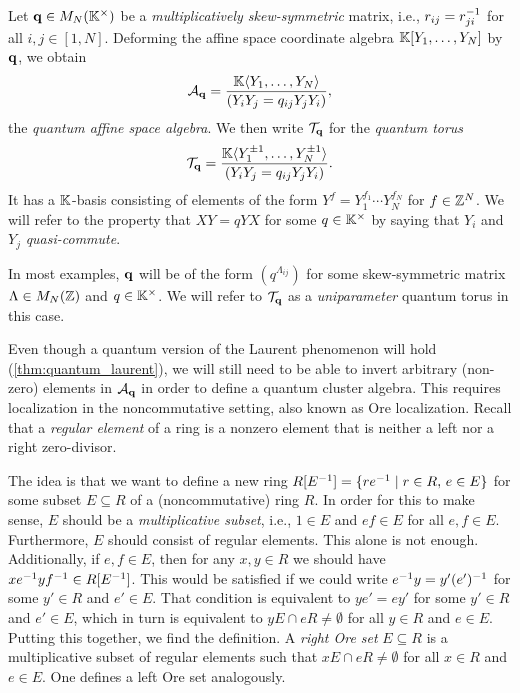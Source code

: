 Let $\mathbf{q} \in M_N(\mathbb{K}^\times)$ be a \emph{multiplicatively
	skew-symmetric} matrix, i.e., $r_{ij} =
	r_{ji}^{-1}$ for all $i,j \in [1, N]$. Deforming the affine space coordinate algebra
$\mathbb{K}[Y_1, \dots, Y_N]$ by $\mathbf{q}$, we obtain
\begin{equation*}
	\mathcal{A}_{\mathbf{q}} = \frac{\mathbb{K} \langle Y_1 , \dots, Y_N\rangle}{(Y_i Y_j = q_{ij}Y_j Y_i)},
\end{equation*}
the \emph{quantum affine space algebra}. We then write $\mathcal{T}_{\mathbf{q}}$ for the \emph{quantum torus}
\begin{equation}\label{eq:quantum_torus}
	\mathcal{T}_{\mathbf{q}} = \frac{\mathbb{K} \langle Y_1^{\pm 1} , \dots, Y_N^{\pm 1}\rangle}{(Y_i Y_j = q_{ij}Y_j Y_i)}.
\end{equation}
%
It has a $\mathbb{K}$-basis consisting of elements of the form $Y^f = Y_1^{f_1} \cdots
	Y_N^{f_N}$ for $f \in \mathbb{Z}^N$. We will refer to the property that $X Y = qY X$ for some
$q \in \mathbb{K}^\times$ by saying that $Y_i$ and $Y_j$
\emph{quasi-commute}.
\begin{remark}

	In most examples, $\mathbf{q}$ will be of the form $(q^{\Lambda_{ij}})$ for some
	skew-symmetric matrix $\Lambda \in M_N(\mathbb{Z})$ and $q\in \mathbb{K}^\times$. We will refer to
	$\mathcal{T}_{\mathbf{q}}$ as a \emph{uniparameter} quantum torus in this case.
\end{remark}
%

Even though a quantum version of the Laurent phenomenon will hold
(\cref{thm:quantum_laurent}), we will still need to be able to invert arbitrary
(non-zero) elements in $\mathcal{A}_{\mathbf{q}}$ in order to define a quantum cluster algebra. This
requires localization in the noncommutative setting, also known as Ore localization.
Recall that a \emph{regular element} of a ring is a nonzero
element that is neither a left nor a right zero-divisor.

The idea is that we want to define a new ring $R[E^{-1}] = \{re^{-1} \mid r \in R,\,e \in
	E\}$ for some subset $E \subseteq R$ of a (noncommutative) ring $R$. In order for this
to make sense, $E$ should be a \emph{multiplicative subset}, i.e., $1 \in E$ and $ef \in E$ for all $e,f \in E$. Furthermore, $E$ should
consist of regular elements. This alone is not enough. Additionally, if $e, f \in E$,
then for any $x, y \in R$ we should have $xe^{-1} yf^{-1} \in R[E^{-1}]$. This would be
satisfied if we could write $e^{-1} y = y' (e')^{-1}$ for some $y' \in R$ and $e' \in E$.
That condition is equivalent to $y e' = e y'$ for some $y' \in R$ and $e' \in E$, which
in turn is equivalent to $y E \cap e R \neq \emptyset$ for all $y \in R$ and $e \in E$.
Putting this together, we find the definition. A \emph{right Ore set} $E
	\subseteq R$ is a multiplicative subset of regular elements such that $x E \cap e R
	\neq \emptyset$ for all $x \in R$ and $e \in E$. One defines a left Ore set
analogously.

